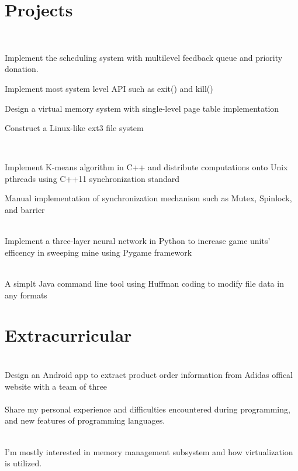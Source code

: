 \documentclass[]{deedy-resume-openfont}
\begin{document}
\section{Projects}
\raggedright

\\
\begin{tightemize}
	\item Implement the scheduling system with multilevel feedback queue and priority donation.
	\item Implement most system level API such as exit() and kill()
	\item Design a virtual memory system with single-level page table implementation
	\item Construct a Linux-like ext3 file system
\end{tightemize}
\sectionsep
  

\hfill \\
\begin{tightemize}
	\item Implement K-means algorithm in C++ and distribute computations onto Unix pthreads using C++11 synchronization standard
	\item Manual implementation of synchronization mechanism such as Mutex, Spinlock, and barrier
\end{tightemize}
\sectionsep

\\
Implement a three-layer neural network in Python to increase game units' efficency in sweeping mine using Pygame framework\\
\sectionsep

\\
A simplt Java command line tool using Huffman coding to modify file data in any formats\\
%
%
\section{Extracurricular}
\hfill {} \\
Design an Android app to extract product order information from Adidas offical website with a team of three\\
\sectionsep
{} \hfill {} \\
Share my personal experience and difficulties encountered during programming, and new features of programming languages.
\sectionsep

 \\
I'm mostly interested in memory management subsystem and how virtualization is utilized.\\
\end{document}
